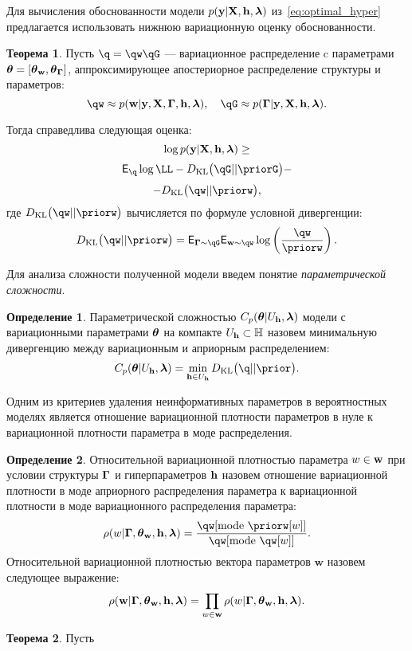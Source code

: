 \documentclass[11pt, a5paper]{dissert}
\theoremstyle{definition}
\newtheorem{theorem}{Теорема}
\newtheorem{defin}{Определение}
\begin{document}
{Для вычисления обоснованности модели $p(\mathbf{y}|\mathbf{X}, \mathbf{h},\boldsymbol{\lambda})$ из~\eqref{eq:optimal_hyper} предлагается использовать нижнюю вариационную оценку обоснованности.

\begin{theorem}
Пусть $\q = \qw \qG$ --- вариационное распределение c параметрами $\boldsymbol{\theta}= [\boldsymbol{\theta}_\mathbf{w}, \boldsymbol{\theta}_{\boldsymbol{\Gamma}} ]$, аппроксимирующее апостериорное распределение структуры и параметров:
\[
   \qw  \approx \postw, \quad    \qG \approx \postG.
\]

Тогда справедлива следующая оценка:
\begin{equation}
\label{eq:full_elbo}
\log p(\mathbf{y}|\mathbf{X}, \mathbf{h},\boldsymbol{\lambda}) \geq
\end{equation}
\[
 \E_{\q}  \log \LL - \KL{\qG}{\priorG} - 
\]
\[
 - \KL{\qw}{\priorw},
\]
где $\KL{\qw}{\priorw}$ вычисляется по формуле условной дивергенции:
\[
\KL{\qw}{\priorw} = \E_{\G \sim \qG} \E_{\w \sim \qw} \log \left(\frac{\qw}{\priorw}\right).
\]
\end{theorem}


Для анализа сложности полученной модели введем понятие \textit{параметрической сложности}. 
\begin{defin} 
Параметрической сложностью  $C_p(\boldsymbol{\theta}|U_{\mathbf{h}}, \boldsymbol{\lambda})$ модели с вариационными параметрами $\boldsymbol{\theta}$ на компакте $U_{\mathbf{h}} \subset \mathbb{H}$ назовем минимальную дивергенцию между вариационным и априорным распределением:
\[
C_p(\teta|\Uh, \lam) = \min_{\h \in \Uh} \KL{\q}{\prior}.
\]
\end{defin}

Одним из критериев удаления неинформативных параметров в вероятностных моделях является отношение вариационной плотности параметров в нуле к вариационной плотности параметра в моде распределения.
\begin{defin}
Относительной вариационной   плотностью параметра $w \in \mathbf{w}$  при условии структуры $\boldsymbol{\Gamma}$ и гиперпараметров $\mathbf{h}$ назовем отношение вариационной плотности в моде априорного распределения параметра к вариационной плотности в моде вариационного распределения параметра:
\[
\rho(w|\G,\tetaw, \h,\lam)=\frac{\qw[\text{mode}~\priorw[w]]}{\qw[\text{mode}~{\qw[w]}]}.
\]
Относительной вариационной плотностью вектора параметров $\mathbf{w}$ назовем следующее выражение:
\begin{equation}
\label{eq:rho_general}
    {\rho}(\mathbf{w}|\boldsymbol{\Gamma}, \boldsymbol{\theta}_\mathbf{w}, \mathbf{h},\boldsymbol{\lambda}) = \prod_{w \in \mathbf{w}}\rho(w|\boldsymbol{\Gamma},\boldsymbol{\theta}_\mathbf{w},\mathbf{h},\boldsymbol{\lambda}).
\end{equation}

\end{defin}

\begin{theorem}
Пусть
\begin{enumerate}


\end{enumerate}
\end{theorem}}
\end{document}
